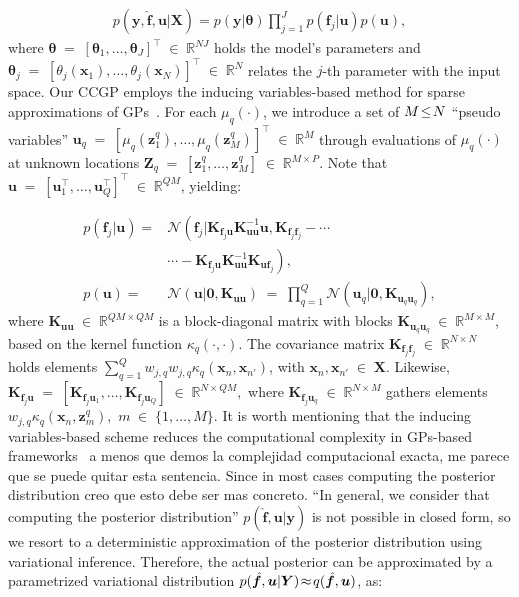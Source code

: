 \documentclass[journal]{IEEEtran}
\providecommand{\ve}[1]{{\bm{#1}}}%
\providecommand{\mat}[1]{{\bm{#1}}} %
\newcommand{\Real}{\mathbb{R}}
\DeclareMathOperator{\en}{\!\,\in\!\,}
\DeclareMathOperator{\igual}{\!\,=\!\,}
\providecommand{\s}[1]{\negthinspace#1\negthinspace}%
\providecommand{\ve}[1]{{\mathbf{#1}}}
\providecommand{\mat}[1]{{\mathbf{#1}}}
\newcommand{\gauss}{\mathcal{N}} %
\newcommand{\comment}[2]{{\color{blue}#1} {\color{red}#2}}
\begin{document}
\begin{align}
p(\ve{y},\hat{\ve{f}},\ve{u}|\mat{X})=p(\ve{y}|\bm{\theta}) \prod_{j=1}^{J}p(\ve{f}_j|{\ve{u}})p({\ve{u}}),
\end{align} 
where $\bm{\theta}\igual[\bm{\theta}_1,\dots ,\bm{\theta}_J]^{\top}\en\Real^{NJ}$ holds the model's parameters and $\bm{\theta}_j\igual[\theta_j(\ve{x}_1),\dots ,\theta_j(\ve{x}_N)]^{\top}\en\Real^{N}$ relates the $j$-th parameter with the input space. Our CCGP employs the inducing variables-based method for sparse approximations of GPs~\cite{hensman2015scalable}. For each $\mu_q(\cdot)$, we introduce a set of $M\s{\leq}N$ ``pseudo variables'' $\ve{u}_ q\igual [\mu_q(\ve{z}_1^q), \dots , \mu_q(\ve{z}_M^q)]^{\top}\en \Real^{M}$ through evaluations of $\mu_q(\cdot)$ at unknown locations $\mat{Z}_q \igual [\ve{z}_1^q, \dots , \ve{z}_M^q]\en \Real^{M\times P}$. Note that ${\ve{u}} \igual \left[\ve{u}_1^{\top}, \dots , \ve{u}_Q^{\top} \right]^{\top} \en \Real^{QM}$, yielding:

\begin{align}
\label{eq:CCGPprior}
p(\ve{f}_j|{\ve{u}})=& \gauss\left(\ve{f}_j|\mat{K}_{\ve{f}_j{\ve{u}}}\mat{K}^{-1}_{{\ve{u}}{\ve{u}}}{\ve{u}},\mat{K}_{\ve{f}_j\ve{f}_j}\right.-\cdots \nonumber\\
&\cdots-\left.\mat{K}_{\ve{f}_j{\ve{u}}}\mat{K}^{-1}_{{\ve{u}}{\ve{u}}}\mat{K}_{{\ve{u}}\ve{f}_j}\right),\\
p({\ve{u}}) =& \gauss\left({\ve{u}}| \ve{0}, \mat{K}_{{\ve{u}}{\ve{u}}}\right)\igual \prod_{q=1}^{Q}\gauss(\ve{u}_q|\ve{0},\mat{K}_{\ve{u}_q\ve{u}_q}),
\end{align}
where $\mat{K}_{{\ve{u}}{\ve{u}}} \en \Real^{QM\times QM}$ is a block-diagonal matrix with blocks $\mat{K}_{\ve{u}_q\ve{u}_q}\en \Real^{M\times M}$, based on the kernel function ${\kappa}_q(\cdot,\cdot)$.  The covariance matrix $\mat{K}_{\ve{f}_j\ve{f}_j}\en \Real^{N\times N}$ 
holds elements
$\sum_{q=1}^{Q}w_{j,q}w_{j,q}{\kappa}_q(\ve{x}_n,\ve{x}_{n'})$, with
$\ve{x}_n,\ve{x}_{n'}\en\mat{X}$. Likewise,
$\mat{K}_{\ve{f}_j{\ve{u}}}\igual [\mat{K}_{\ve{f}_j\ve{u}_1}, \dots ,
\mat{K}_{\ve{f}_j\ve{u}_Q}]\en \Real^{N\times QM},$ where
$\mat{K}_{\ve{f}_j\ve{u}_q} \en \Real^{N\times M}$ gathers elements
$w_{j,q}{\kappa}_q(\ve{x}_n, \ve{z}^q_m),$ $m\en\{1,\dots,M\}.$
\comment{It is worth  mentioning  that the inducing variables-based
  scheme reduces the computational complexity in GPs-based
  frameworks~\cite{alvarez2010efficient}}{a menos que demos la
  complejidad computacional exacta, me parece que se puede quitar esta
sentencia}.
\comment{Since in most cases computing the posterior
  distribution}{creo que esto debe ser mas concreto. ``In general, we
  consider that computing the posterior distribution''}
$p(\hat{\ve{f}},\ve{u}|\ve{y})$ is not possible in closed form,
\comment{}{so} we resort to a deterministic approximation of the posterior distribution using variational inference. Therefore, the actual posterior can be approximated by a parametrized variational distribution $p(\hat{\ve{f}},{\ve{u}}|\mat{Y})\s{\approx} q(\hat{\ve{f}},{\ve{u}})$, as:
\end{document}
